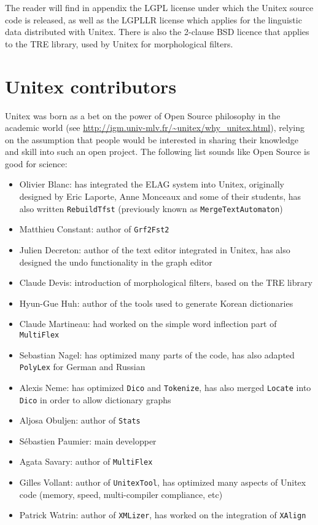 \bigskip \noindent The reader will find in appendix the LGPL license
under which the Unitex source code is released, as well as the LGPLLR license
which applies for the linguistic data distributed with Unitex. There is also
the 2-clause BSD licence that applies to the TRE library, used by Unitex for 
morphological filters.


\section*{Unitex contributors}
Unitex was born as a bet on the power of Open Source philosophy in the academic
world (see \url{http://igm.univ-mlv.fr/~unitex/why_unitex.html}), 
relying on the assumption that people would be interested in sharing
their knowledge and skill into such an open project. The following list
sounds like Open Source is good for science:

\begin{itemize}
    \item Olivier Blanc: has integrated the ELAG system into Unitex, originally
    designed by Eric Laporte, Anne Monceaux and some of their students, has
    also written \verb+RebuildTfst+ (previously known as \verb+MergeTextAutomaton+)
    \item Matthieu Constant: author of \verb+Grf2Fst2+
    \item Julien Decreton: author of the text editor integrated in Unitex,
    has also designed the undo functionality in the graph editor
    \item Claude Devis: introduction of morphological filters, 
    based on the TRE library
    \item Hyun-Gue Huh: author of the tools used to
    generate Korean dictionaries
    \item Claude Martineau: had worked on the simple word inflection part of
    \verb+MultiFlex+
    \item Sebastian Nagel: has optimized many parts of the code, has also
    adapted \verb+PolyLex+ for German and Russian
    \item Alexis Neme: has optimized \verb+Dico+ and \verb+Tokenize+, has also
    merged \verb+Locate+ into \verb+Dico+ in order to allow dictionary graphs 
    \item Aljosa Obuljen: author of \verb+Stats+
    \item S\'ebastien Paumier: main developper
    \item Agata Savary: author of \verb+MultiFlex+
    \item Gilles Vollant: author of \verb+UnitexTool+, has optimized many
    aspects of Unitex code (memory, speed, multi-compiler compliance, etc)
    \item Patrick Watrin: author of \verb+XMLizer+, has worked on the
    integration of \verb+XAlign+
\end{itemize}

